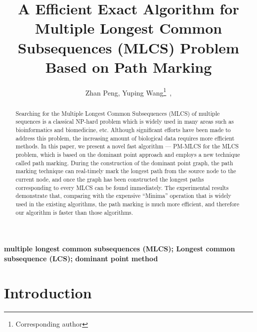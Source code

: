\documentclass{article}
\begin{document}
\title{A Efficient Exact Algorithm for Multiple Longest Common
  Subsequences (MLCS) Problem Based on Path Marking}

\author{Zhan Peng, Yuping Wang\footnote{Corresponding author}~,}


\maketitle


\begin{abstract}

  Searching for the Multiple Longest Common Subsequences (MLCS) of
  multiple sequences is a classical NP-hard problem which is widely
  used in many areas such as bioinformatics and biomedicine,
  etc. Although significant efforts have been made to address this
  problem, the increasing amount of biological data requires more
  efficient methods. In this paper, we present a novel fast algorithm
  --- PM-MLCS for the MLCS problem, which is based on the dominant
  point approach and employs a new technique called path
  marking. During the construction of the dominant point graph, the
  path marking technique can real-timely mark the longest path from
  the source node to the current node, and once the graph has been
  constructed the longest paths corresponding to every MLCS can be
  found immediately. The experimental results demonstrate that,
  comparing with the expensive ``Minima'' operation that is widely
  used in the existing algorithms, the path marking is much more
  efficient, and therefore our algorithm is faster than those
  algorithms.

\end{abstract}

\textbf{multiple longest common subsequences (MLCS); Longest common
  subsequence (LCS); dominant point method}


\section{Introduction}
\label{sec:introduction}
\end{document}
